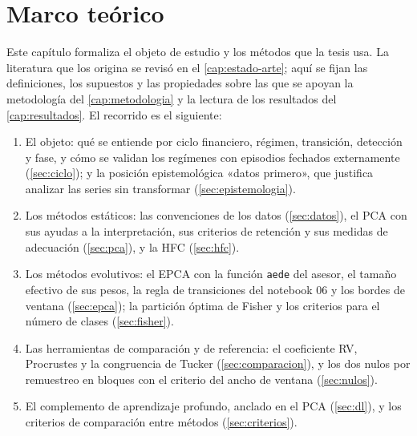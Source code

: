 \chapter{Marco teórico}
\label{cap:marco}

Este capítulo formaliza el objeto de estudio y los métodos que la tesis usa. La literatura que
los origina se revisó en el \cref{cap:estado-arte}; aquí se fijan las definiciones, los supuestos
y las propiedades sobre las que se apoyan la metodología del \cref{cap:metodologia} y la lectura
de los resultados del \cref{cap:resultados}. El recorrido es el siguiente:

\begin{enumerate}[leftmargin=*]
  \item El objeto: qué se entiende por ciclo financiero, régimen, transición, detección y fase, y
    cómo se validan los regímenes con episodios fechados externamente
    (\cref{sec:ciclo}); y la posición epistemológica «datos primero», que justifica analizar las
    series sin transformar (\cref{sec:epistemologia}).
  \item Los métodos estáticos: las convenciones de los datos (\cref{sec:datos}), el PCA con sus
    ayudas a la interpretación, sus criterios de retención y sus medidas de adecuación
    (\cref{sec:pca}), y la HFC (\cref{sec:hfc}).
  \item Los métodos evolutivos: el EPCA con la función \texttt{aede} del asesor, el tamaño
    efectivo de sus pesos, la regla de transiciones del notebook 06 y los bordes de ventana
    (\cref{sec:epca}); la partición óptima de Fisher y los criterios para el número de clases
    (\cref{sec:fisher}).
  \item Las herramientas de comparación y de referencia: el coeficiente RV, Procrustes y la
    congruencia de Tucker (\cref{sec:comparacion}), y los dos nulos por remuestreo en bloques con
    el criterio del ancho de ventana (\cref{sec:nulos}).
  \item El complemento de aprendizaje profundo, anclado en el PCA (\cref{sec:dl}), y los
    criterios de comparación entre métodos (\cref{sec:criterios}).
\end{enumerate}

